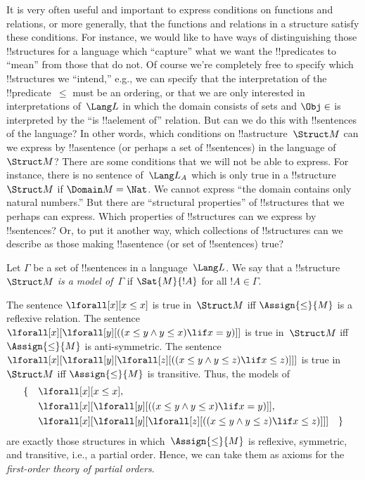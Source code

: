 \documentclass[../../include/open-logic-section]{subfiles}
\begin{document}


\begin{explain}
It is very often useful and important to express conditions on
functions and relations, or more generally, that the functions and
relations in a structure satisfy these conditions.  For instance, we
would like to have ways of distinguishing those !!{structure}s for a
language which ``capture'' what we want the !!{predicate}s to ``mean''
from those that do not.  Of course we're completely free to specify
which !!{structure}s we ``intend,'' e.g., we can specify that the
interpretation of the !!{predicate}~$\le$ must be an ordering, or that
we are only interested in interpretations of~$\Lang L$ in which the
domain consists of sets and $\Obj \in$ is interpreted by the ``is
!!a{element} of'' relation.  But can we do this with !!{sentence}s of
the language? In other words, which conditions on
!!a{structure}~$\Struct M$ can we express by !!a{sentence} (or perhaps
a set of !!{sentence}s) in the language of~$\Struct M$?  There are
some conditions that we will not be able to express.  For instance,
there is no sentence of~$\Lang L_A$ which is only true in a
!!{structure}~$\Struct M$ if $\Domain M = \Nat$.  We cannot express
``the domain contains only natural numbers.''  But there are
``structural properties'' of !!{structure}s that we perhaps can
express.  Which properties of !!{structure}s can we express by
!!{sentence}s? Or, to put it another way, which collections of
!!{structure}s can we describe as those making !!a{sentence} (or set
of !!{sentence}s) true?
\end{explain}

\begin{defn}
Let $\Gamma$ be a set of !!{sentence}s in a language~$\Lang L$.  We
say that a !!{structure}~$\Struct M$ \emph{is a model of}~$\Gamma$ if
$\Sat{M}{!A}$ for all $!A \in \Gamma$.
\end{defn}

\begin{ex}
The sentence $\lforall[x][x \le x]$ is true in~$\Struct M$ iff
$\Assign{\le}{M}$ is a reflexive relation. The sentence
$\lforall[x][\lforall[y][((x \le y \land y \le x) \lif x = y)]]$ is
true in~$\Struct M$ iff $\Assign{\le}{M}$ is anti-symmetric.  The
sentence $\lforall[x][\lforall[y][\lforall[z][((x \le y \land y \le z)
      \lif x \le z)]]]$ is true in~$\Struct M$ iff $\Assign{\le}{M}$
is transitive.  Thus, the models of
\begin{align*}
\{\quad &\lforall[x][x \le x], \\
   & \lforall[x][\lforall[y][((x \le y \land y \le
    x) \lif x = y)]], \\
   &\lforall[x][\lforall[y][\lforall[z][((x \le y
      \land y \le z) \lif x \le z)]]] \quad \}
\end{align*}
are exactly those structures in which~$\Assign{\le}{M}$ is reflexive,
symmetric, and transitive, i.e., a partial order.  Hence, we can take
them as axioms for the \emph{first-order theory of partial orders}.
\end{ex}
\end{document}
